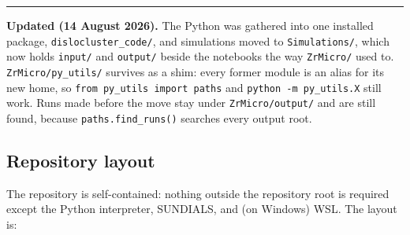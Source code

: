 \documentclass[11pt]{article}
\newcommand{\code}[1]{\texttt{\small #1}}
\newcommand{\file}[1]{\texttt{\footnotesize #1}}
\newenvironment{notebox}
  {\par\medskip\noindent
   \begin{minipage}{\textwidth}
   {\color{blue!50!black}\rule{\textwidth}{0.8pt}}\par\smallskip
   \small\noindent{\color{blue!50!black}\textbf{Note.}}\space}
  {\par\smallskip\noindent{\color{blue!50!black}\rule{\textwidth}{0.8pt}}
   \end{minipage}\par\medskip}
\begin{document}
\begin{notebox}
\textbf{Updated (14 August 2026).} The Python was gathered into one installed
package, \file{dislocluster\_code/}, and simulations moved to
\file{Simulations/}, which now holds \file{input/} and \file{output/} beside
the notebooks the way \file{ZrMicro/} used to. \file{ZrMicro/py\_utils/}
survives as a shim: every former module is an alias for its new home, so
\code{from py\_utils import paths} and \code{python -m py\_utils.X} still
work. Runs made before the move stay under \file{ZrMicro/output/} and are
still found, because \code{paths.find\_runs()} searches every output root.
\end{notebox}

\subsection{Repository layout}
\label{sec:layout}

The repository is self-contained: nothing outside the repository root is
required except the Python interpreter, SUNDIALS, and (on Windows) WSL. The
layout is:
\end{document}
